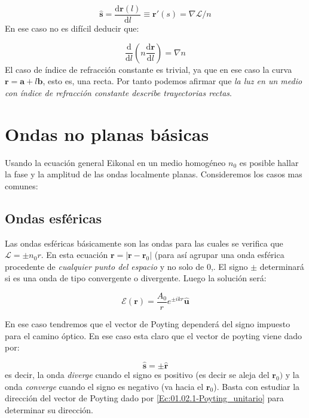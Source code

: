 \documentclass[12pt,a4paper]{book}
\numberwithin{equation}{section}
\numberwithin{figure}{section}
\newcommand{\parentesis}[1]{\left( #1  \right)}
\newcommand{\D}{\mathrm{d}}
\newcommand{\derivadas}[2]{\frac{\D #1}{\D #2}}
\newcommand{\1}{_{(1)}}
\newcommand{\2}{_{(2)}}
\newcommand{\un}{\mathbf{u}}
\newcommand{\rn}{\mathbf{r}}
\newcommand{\sn}{\mathbf{s}}
\newcommand{\an}{\mathbf{a}}
\newcommand{\bn}{\mathbf{b}}
\newcommand{\Encal}{\boldsymbol{\mathcal{E}}}
\newcommand{\hnu}{\hat{\un}}
\newcommand{\hns}{\hat{\sn}}
\newcommand{\hnr}{\hat{\rn}}
\theoremstyle{definition}
\begin{document}
\begin{equation}
\hns =  \derivadas{\rn (l)}{ l} \equiv \rn ' (s) = \nabla \mathcal{L} / n
\end{equation}
En ese caso no es difícil deducir que:

\begin{equation}
\derivadas{}{l} \parentesis{ n \derivadas{\rn}{l}} = \nabla n
\end{equation}
El caso de índice de refracción constante es trivial, ya que en ese caso la curva $\rn = \an + l \bn$, esto es, una recta. Por tanto podemos afirmar que \textit{la luz en un medio con índice de refracción constante describe trayectorias rectas}. 

\section{Ondas no planas básicas}

Usando la ecuación general Eikonal en un medio homogéneo $n_0$ es posible hallar la fase y la amplitud de las ondas localmente planas. Consideremos los casos  mas comunes:

\subsection{Ondas esféricas}

Las ondas esféricas básicamente son las ondas para las cuales se verifica que $\mathcal{L} = \pm n_0 r$. En esta ecuación $\rn = | \rn  - \rn_0|$ (para así agrupar una onda esférica procedente de \textit{cualquier punto del espacio} y no solo de 0,. El signo $\pm$ determinará si es una onda de tipo convergente o divergente. Luego la solución será:

\begin{equation}
\Encal (\rn) = \dfrac{A_0}{r} e^{ \pm i kr} \hnu
\end{equation}

En ese caso tendremos que el vector de Poyting dependerá del signo impuesto para el camino óptico. En ese caso esta claro que el vector de poyting viene dado por:

\begin{equation}
\hns = \pm \hnr
\end{equation} 
es decir, la onda \textit{diverge} cuando el signo es positivo (es decir se aleja del $\rn_0)$ y la onda \textit{converge} cuando el signo es negativo (va hacia el $\rn_0$). Basta con estudiar la dirección del vector de Poyting dado por \ref{Ec:01.02.1-Poyting_unitario} para determinar su dirección. 
\end{document}
